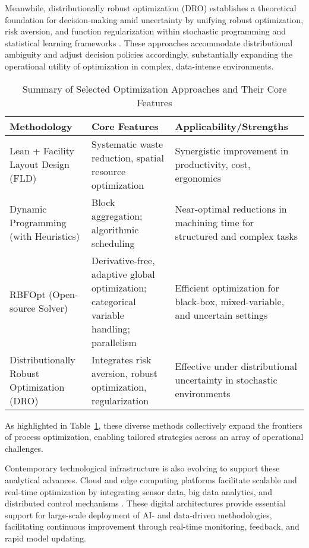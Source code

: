 \documentclass[11pt]{article}
\begin{document}
Meanwhile, distributionally robust optimization (DRO) establishes a theoretical foundation for decision-making amid uncertainty by unifying robust optimization, risk aversion, and function regularization within stochastic programming and statistical learning frameworks \cite{ref76}. These approaches accommodate distributional ambiguity and adjust decision policies accordingly, substantially expanding the operational utility of optimization in complex, data-intense environments.

\begin{table}[htbp]
    \centering
    \caption{Summary of Selected Optimization Approaches and Their Core Features}
    \label{tab:optimization_methods}
    \begin{tabular}{|l|p{4cm}|p{4.5cm}|}
        \hline
        \textbf{Methodology} & \textbf{Core Features} & \textbf{Applicability/Strengths} \\
        \hline
        Lean + Facility Layout Design (FLD) & Systematic waste reduction, spatial resource optimization & Synergistic improvement in productivity, cost, ergonomics \\
        \hline
        Dynamic Programming (with Heuristics) & Block aggregation; algorithmic scheduling & Near-optimal reductions in machining time for structured and complex tasks \\
        \hline
        RBFOpt (Open-source Solver) & Derivative-free, adaptive global optimization; categorical variable handling; parallelism & Efficient optimization for black-box, mixed-variable, and uncertain settings \\
        \hline
        Distributionally Robust Optimization (DRO) & Integrates risk aversion, robust optimization, regularization & Effective under distributional uncertainty in stochastic environments \\
        \hline
    \end{tabular}
\end{table}

As highlighted in Table~\ref{tab:optimization_methods}, these diverse methods collectively expand the frontiers of process optimization, enabling tailored strategies across an array of operational challenges.

Contemporary technological infrastructure is also evolving to support these analytical advances. Cloud and edge computing platforms facilitate scalable and real-time optimization by integrating sensor data, big data analytics, and distributed control mechanisms \cite{ref80}. These digital architectures provide essential support for large-scale deployment of AI- and data-driven methodologies, facilitating continuous improvement through real-time monitoring, feedback, and rapid model updating.
\end{document}
